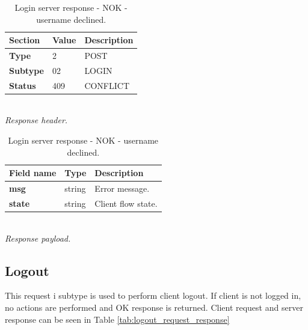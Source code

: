 \documentclass[english, sem, kiv, he, iso690alph, pdf, viewonly]{fasthesis}
\begin{document}
\begin{table}[h]
	\centering
	\begin{minipage}[b]{0.45\textwidth}
		\centering
		\begin{tabular}{|l|l|l|}
			\hline
			\textbf{Section} & \textbf{Value} & \textbf{Description} \\ \hline
			\textbf{Type} & 2 & POST \\ \hline
			\textbf{Subtype} & 02 & \footnotesize{LOGIN} \\ \hline
			\textbf{Status} & 409 & \footnotesize{CONFLICT} \\ \hline
		\end{tabular} \\
		\textit{Response header.}
	\end{minipage} 
	\hfill
	\begin{minipage}[b]{0.5\textwidth}
		\centering
		\begin{tabular}{|l|l|p{70pt}|}
			\hline
			\textbf{Field name} & \textbf{Type} & \textbf{Description} \\ \hline
			\textbf{msg} & string & Error message. \\ \hline
			\textbf{state} & string & Client flow state. \\ \hline
		\end{tabular} \\
		\textit{Response payload.}
	\end{minipage}	
	\caption{Login server response - NOK - username declined.}
	\label{tab:login_server_response_nok}
\end{table}

\newpage

\subsection{Logout}

This request i subtype is used to perform client logout. If client is not logged in, no actions are performed and OK response is returned. Client request and server response can be seen in Table \ref{tab:logout_request_response} 
\end{document}

